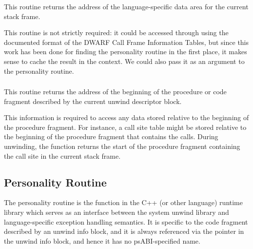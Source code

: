 This routine returns the address of the language-specific data area for
the current stack frame.

This routine is not strictly required: it could be accessed through
 using the documented format of the DWARF Call Frame
Information Tables, but since this work has been done for finding the
personality routine in the first place, it makes sense to cache the
result in the context.
We could also pass it as an argument to the personality routine.

\subsubsection{}


This routine returns the address of the beginning of the procedure or
code fragment described by the current unwind descriptor block.

This information is required to access any data stored relative to the
beginning of the procedure fragment. For instance, a call site table
might be stored relative to the beginning of the procedure fragment
that contains the calls. During unwinding, the function returns the
start of the procedure fragment containing the call site in the current
stack frame.

\subsection{Personality Routine}


The personality routine is the function in the C++ (or other language)
runtime library which serves as an interface between the system
unwind library and language-specific exception handling semantics.
It is specific to the code fragment described by an unwind info block,
and it is always referenced via the pointer in the unwind info block,
and hence it has no psABI-specified name.

